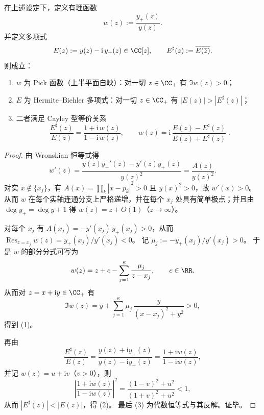 \begin{conclusion}\label{con:xi-terminal-wronskian-hermite-biehler-pick-map}
在上述设定下，定义有理函数
\[
w(z):=\frac{y_{+}(z)}{y(z)}.
\]
并定义多项式
\[
E(z):=y(z)-\mathrm{i}\,y_{+}(z)\in\CC[z],\qquad
E^\sharp(z):=\overline{E(\overline z)}.
\]
则成立：
\begin{enumerate}
  \item \(w\) 为 Pick 函数（上半平面自映）：对一切 \(z\in\CC_{+}\) 有 \(\Im w(z)>0\)；
  \item \(E\) 为 Hermite--Biehler 多项式：对一切 \(z\in\CC_{+}\) 有 \(|E(z)|>|E^\sharp(z)|\)；
  \item 二者满足 Cayley 型等价关系
  \[
  \boxed{\;
  \frac{E^\sharp(z)}{E(z)}=\frac{1+\mathrm{i}\,w(z)}{1-\mathrm{i}\,w(z)},
  \qquad
  w(z)=\mathrm{i}\,\frac{E(z)-E^\sharp(z)}{E(z)+E^\sharp(z)}\; } .
  \]
\end{enumerate}
\end{conclusion}
\begin{proof}
由 Wronskian 恒等式得
\[
w'(z)=\frac{y(z)y_{+}'(z)-y'(z)y_{+}(z)}{y(z)^2}=\frac{A(z)}{y(z)^2}.
\]
对实 \(x\notin\{x_j\}\)，有 \(A(x)=\prod_k|x-p_k|^2>0\) 且 \(y(x)^2>0\)，故 \(w'(x)>0\)。
从而 \(w\) 在每个实轴连通分支上严格递增，并在每个 \(x_j\) 处具有简单极点；并且由 \(\deg y_{+}=\deg y+1\) 得 \(w(z)=z+O(1)\)（\(z\to\infty\)）。
\par
对每个 \(x_j\) 有 \(A(x_j)=-y'(x_j)\,y_{+}(x_j)>0\)，从而
\(
\operatorname*{Res}_{z=x_j}w(z)=y_{+}(x_j)/y'(x_j)<0
\)。
记 \(\mu_j:=-y_{+}(x_j)/y'(x_j)>0\)。
于是 \(w\) 的部分分式可写为
\[
w(z)=z+c-\sum_{j=1}^{\kappa}\frac{\mu_j}{z-x_j},\qquad c\in\RR.
\]
从而对 \(z=x+\mathrm{i}y\in\CC_{+}\) 有
\[
\Im w(z)=y+\sum_{j=1}^{\kappa}\mu_j\,\frac{y}{(x-x_j)^2+y^2}>0,
\]
得到 (1)。
\par
再由
\[
\frac{E^\sharp(z)}{E(z)}
=\frac{y(z)+\mathrm{i}y_{+}(z)}{y(z)-\mathrm{i}y_{+}(z)}
=\frac{1+\mathrm{i}w(z)}{1-\mathrm{i}w(z)},
\]
并记 \(w(z)=u+\mathrm{i}v\)（\(v>0\)），则
\[
\left|\frac{1+\mathrm{i}w(z)}{1-\mathrm{i}w(z)}\right|^2
=\frac{(1-v)^2+u^2}{(1+v)^2+u^2}<1,
\]
从而 \(|E^\sharp(z)|<|E(z)|\)，得 (2)。
最后 (3) 为代数恒等式与其反解。证毕。
\end{proof}

